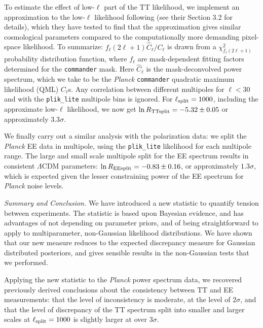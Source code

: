 \documentclass[amsmath, amssymb, reprint, aps]{revtex4-1}
\begin{document}
{        To estimate the effect of low-$\ell$ part of the TT likelihood, we implement an approximation to the low-$\ell$ likelihood following \cite{Aghanim:2016sns} (see their Section 3.2 for details), which they have tested to find that the approximation gives similar cosmological parameters compared to the computationally more demanding pixel-space likelihood. To summarize: $f_\ell(2\ell+1) \hat{C}_\ell/C_\ell$ is drawn from a $\chi^2_{f_\ell(2\ell+1)}$ probability distribution function, where $f_\ell$ are mask-dependent fitting factors determined for the {\tt commander} mask. Here $\hat{C}_\ell$ is the mask-deconvolved power spectrum, which we take to be the {\it Planck} {\tt commander} quadratic maximum likelihood (QML) $C_\ell$s. Any correlation between different multipoles for $\ell<30$ and with the {\tt plik\_lite} multipole bins is ignored. For $\ell_{\rm split}=1000$, including the approximate low-$\ell$ likelihood, we now get $\ln R_{\rm TTsplit}=-5.32 \pm 0.05$ or approximately $3.3\sigma$. 
        
        {We finally carry out a similar analysis with the polarization data: we split the {\it Planck} EE data in multipole, using the {\tt plik\_lite} likelihood for each multipole range}. The large and small scale multipole split for the EE spectrum results in consistent $\Lambda$CDM parameters: $\ln R_{\rm EEsplit}=-0.83\pm 0.16$, or approximately $1.3 \sigma$, which is expected given the lesser constraining power of the EE spectrum for {\it Planck} noise levels. 
        
        \medskip
        \textit{Summary and Conclusion.} \label{sec:summary}
        We have introduced a new statistic to quantify tension between experiments. The statistic is based upon Bayesian evidence, and has advantages of not depending on parameter priors, and of being straightforward to apply to multiparameter, non-Gaussian likelihood distributions. We have shown that our new measure reduces to the expected discrepancy measure for Gaussian distributed posteriors, and gives sensible results in the non-Gaussian tests that we performed. 
        
        Applying {the new statistic} to the {\it Planck} power spectrum data, we {recovered} previously derived conclusions about the consistency between TT and EE measurements: that the level of inconsistency is moderate, at the level of $2 \sigma$, and that the level of discrepancy of the TT spectrum {split} into smaller and larger scales at $\ell_{\rm split}=1000$ is slightly larger at over $3 \sigma$.
        
}
\end{document}
